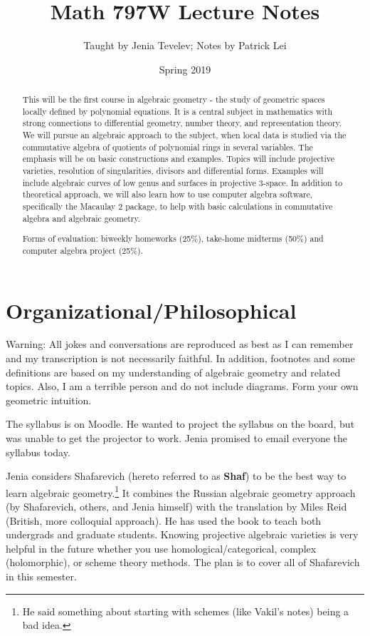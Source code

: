 \documentclass[twoside, 10pt]{article}
\title{Math 797W Lecture Notes}
\author{Taught by Jenia Tevelev; Notes by Patrick Lei}
\affil{University of Massachusetts, Amherst}
\date{Spring 2019}
\begin{document}
    \maketitle\thispagestyle{firstpage}
    
    \begin{abstract} This will be the first course in algebraic geometry - the
        study of geometric spaces locally defined by polynomial equations. It
        is a central subject in mathematics with strong connections to
        differential geometry, number theory, and representation theory. We
        will pursue an algebraic approach to the subject, when local data is
        studied via the commutative algebra of quotients of polynomial rings in
        several variables. The emphasis will be on basic constructions and
        examples.  Topics will include projective varieties, resolution of
        singularities, divisors and differential forms. Examples will include
        algebraic curves of low genus and surfaces in projective 3-space. In
        addition to theoretical approach, we will also learn how to use
        computer algebra software, specifically the Macaulay 2 package, to help
        with basic calculations in commutative algebra and algebraic geometry.

        Forms of evaluation: biweekly homeworks (25\%), take-home midterms
    (50\%) and computer algebra project (25\%).  \end{abstract}

    \tableofcontents

    \section{Organizational/Philosophical}

    Warning: All jokes and conversations are reproduced as best as I can
    remember and my transcription is not necessarily faithful. In addition,
    footnotes and some definitions are based on my understanding of algebraic
    geometry and related topics. Also, I am a terrible person and do not
    include diagrams. Form your own geometric intuition.

    The syllabus is on Moodle. He wanted to project the syllabus on the board,
    but was unable to get the projector to work. Jenia promised to email
    everyone the syllabus today.

    Jenia considers Shafarevich (hereto referred to as \textbf{Shaf}) to be the
    best way to learn algebraic geometry.\footnote{He said something about
    starting with schemes (like Vakil's notes) being a bad idea.} It combines
    the Russian algebraic geometry approach (by Shafarevich, others, and Jenia
    himself) with the translation by Miles Reid (British, more colloquial
    approach). He has used the book to teach both undergrads and graduate
    students. Knowing projective algebraic varieties is very helpful in the
    future whether you use homological/categorical, complex (holomorphic), or
    scheme theory methods. The plan is to cover all of Shafarevich in this
    semester.
    
\end{document}

